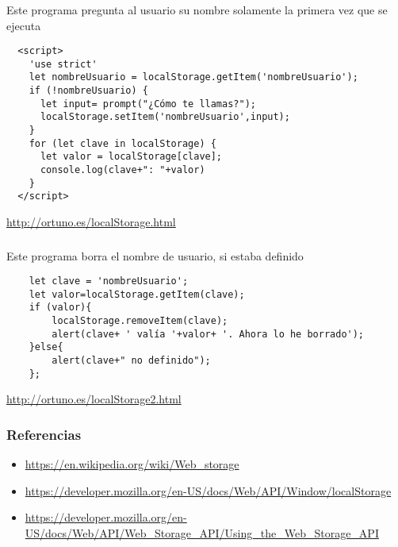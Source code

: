 \documentclass[ucs]{beamer}
\begin{document}
\begin{frame}[fragile]
\frametitle{}
Este programa pregunta al usuario su nombre solamente
la primera vez que se ejecuta

  \begin{scriptsize}
  \begin{verbatim}
  <script>
    'use strict'
    let nombreUsuario = localStorage.getItem('nombreUsuario');
    if (!nombreUsuario) {
      let input= prompt("¿Cómo te llamas?");
      localStorage.setItem('nombreUsuario',input);
    }
    for (let clave in localStorage) {
      let valor = localStorage[clave];
      console.log(clave+": "+valor)
    }
  </script>

  \end{verbatim}
  \end{scriptsize}

\begin{flushright}
\url{http://ortuno.es/localStorage.html}
\end{flushright}
\end{frame}


\begin{frame}[fragile]
\frametitle{}
Este programa borra el nombre de usuario, si estaba definido

  \begin{scriptsize}
  \begin{verbatim}
    let clave = 'nombreUsuario';
    let valor=localStorage.getItem(clave);
    if (valor){
        localStorage.removeItem(clave);
        alert(clave+ ' valía '+valor+ '. Ahora lo he borrado');
    }else{
        alert(clave+" no definido");
    };
  \end{verbatim}
  \end{scriptsize}
\begin{flushright}
\url{http://ortuno.es/localStorage2.html}
\end{flushright}

\end{frame}


\begin{frame}[fragile]
\frametitle{Referencias}
\begin{itemize}
\item
\url{https://en.wikipedia.org/wiki/Web_storage}


\item
\begin{tiny}
\url{https://developer.mozilla.org/en-US/docs/Web/API/Window/localStorage}
\end{tiny}

\item
\begin{tiny}
\url{https://developer.mozilla.org/en-US/docs/Web/API/Web_Storage_API/Using_the_Web_Storage_API}
\end{tiny}
\end{itemize}

\end{frame}
\end{document}
